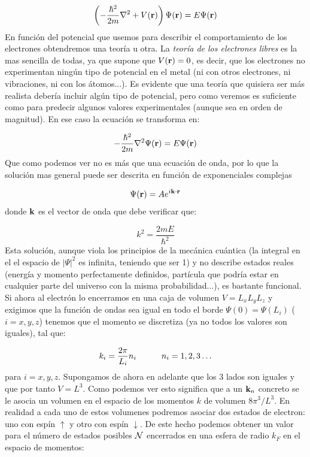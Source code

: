 \begin{equation}
	\left( -\frac{\hbar^2}{2m} \nabla^2 + V(\mathbf{r}) \right) \Psi (\mathbf{r}) = E \Psi (\mathbf{r})
\end{equation}
En función del potencial que usemos para describir el comportamiento de los electrones obtendremos una teoría u otra. La \textit{teoría de los electrones libres} es la mas sencilla de todas, ya que supone que $V(\mathbf{r}) = 0$, es decir, que los electrones no experimentan ningún tipo de potencial en el metal (ni con otros electrones, ni vibraciones, ni con los átomos...). Es evidente que una teoría que quisiera ser más realista debería incluir algún tipo de potencial, pero como veremos es suficiente como para predecir algunos valores experimentales (aunque sea en orden de magnitud). En ese caso la ecuación se transforma en:

\begin{equation}
	-\frac{\hbar^2}{2m} \nabla^2  \Psi (\mathbf{r}) = E \Psi (\mathbf{r}) \label{Ec:06-01-03}
\end{equation}
Que como podemos ver no es más que una ecuación de onda, por lo que la solución mas general puede ser descrita en función de exponenciales complejas

\begin{equation}
	\Psi (\mathbf{r}) = A e^{i \mathbf{k} \cdot \mathbf{r}}
\end{equation}
donde $\mathbf{k}$ es el vector de onda que debe verificar que:

\begin{equation}
	k^2 = \frac{2mE}{\hbar^2}
\end{equation}
Esta solución, aunque viola los principios de la mecánica cuántica (la integral en el el espacio de $|\Psi|^2$ es infinita, teniendo que ser 1) y no describe estados reales (energía y momento perfectamente definidos, partícula que podría estar en cualquier parte del universo con la misma probabilidad...), es bastante funcional. Si ahora al electrón lo encerramos en una caja de volumen $V=L_xL_yL_z$ y exigimos que la función de ondas sea igual en todo el borde $\Psi (0)=\Psi(L_i)$ ($i=x,y,z$) tenemos que el momento se discretiza (ya no todos los valores son iguales), tal que:

\begin{equation}
	k_i = \frac{2\pi}{L_i} n_i \quad \quad \quad n_i = 1,2,3\ldots
\end{equation}
para $i=x,y,z$. Supongamos de ahora en adelante que los 3 lados son iguales y que por tanto $V=L^3$. Como podemos ver esto significa que a un $\mathbf{k}_n$ concreto se le asocia un volumen en el espacio de los momentos $k$ de volumen $8\pi^3 /L^3$. En realidad a cada uno de estos volumenes podremos asociar dos estados de electron: uno con espín $\uparrow$ y otro con espín $\downarrow$. De este hecho podemos obtener un valor para el número de estados posibles $\mathcal{N}$ encerrados en una esfera de radio $k_F$ en el espacio de momentos:

